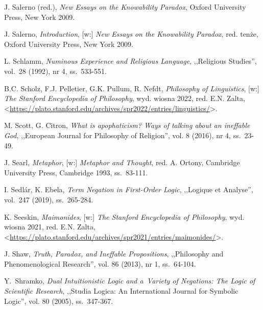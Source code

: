 \begin{thebibliography}{100}
J. Salerno (red.), \textit{New Essays on the Knowability Paradox}, Oxford University Press, New York 2009.

J. Salerno, \textit{Introduction}, [w:] \textit{New Essays on the Knowability Paradox}, red. tenże, Oxford University Press, New York 2009.

L. Schlamm, \textit{Numinous Experience and Religious Language}, ,,Religious Studies'', vol.~28 (1992), nr 4, ss.~533-551.

B.C. Scholz, F.J. Pelletier, G.K. Pullum, R. Nefdt, \textit{Philosophy of Linguistics}, [w:] \textit{The Stanford Encyclopedia of Philosophy},
wyd. wiosna 2022, red. E.N. Zalta, <\url{https://plato.stanford.edu/archives/spr2022/entries/linguistics/}>.


M. Scott, G. Citron, \textit{What is apophaticism? Ways of talking about an ineffable God}, ,,European Journal for Philosophy of Religion'', vol. 8 (2016), nr 4, ss.~23-49.

J. Searl, \textit{Metaphor}, [w:] \textit{Metaphor and Thought}, red. A. Ortony, Cambridge University Press, Cambridge 1993, ss.~83-111.

I. Sedlár, K. Ebela, \textit{Term Negation in First-Order Logic}, ,,Logique et Analyse'', vol.~247 (2019), ss.~265-284.

K. Seeskin, \textit{Maimonides}, [w:] \textit{The Stanford Encyclopedia of Philosophy},
wyd. wiosna 2021, red. E.N. Zalta, <\url{https://plato.stanford.edu/archives/spr2021/entries/maimonides/}>.


J. Shaw, \textit{Truth, Paradox, and Ineffable Propositions}, ,,Philosophy and Phenomenological Research'', vol. 86 (2013), nr 1, ss.~64-104.

Y.~Shramko, \textit{Dual Intuitionistic Logic and a~Variety of Negations: The Logic of Scientific Research}, ,,Studia Logica: An International Journal for Symbolic Logic'', vol. 80 (2005), ss.~347-367.


\end{thebibliography}
